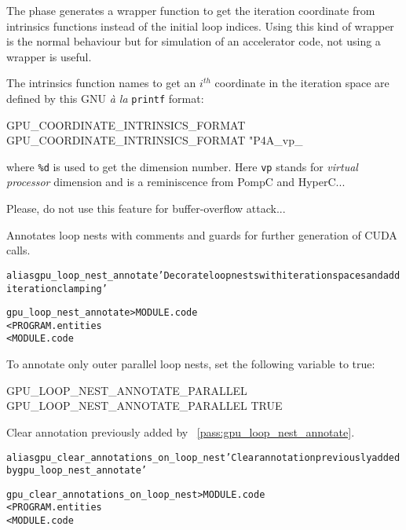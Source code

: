 \documentclass[a4paper]{report}
\newenvironment{PipsMake}{\begin{alltt}}{\end{alltt}}
\newcommand{\PipsPassRef}[1]{\texttt{\detokenize{#1}}~\ref{pass:#1}}
\newenvironment{PipsPass}[1]{\label{pass:#1}}{}
\begin{document}
The phase generates a wrapper function to get the iteration coordinate from
intrinsics functions instead of the initial loop indices. Using this kind
of wrapper is the normal behaviour but for simulation of an accelerator
code, not using a wrapper is useful.

The intrinsics function names to get an $i^{th}$ coordinate in the
iteration space are defined by this GNU \emph{\`a la} \texttt{printf}
format:
\begin{PipsProp}{GPU_COORDINATE_INTRINSICS_FORMAT}
GPU_COORDINATE_INTRINSICS_FORMAT "P4A_vp_%
\end{PipsProp}
where \verb|%d| is used to get the dimension number. Here \texttt{vp}
stands for \emph{virtual processor} dimension and is a reminiscence from
PompC and HyperC...

Please, do not use this feature for buffer-overflow attack...



\begin{PipsPass}{gpu_loop_nest_annotate}
Annotates loop nests with comments and guards for further generation of CUDA calls.
\end{PipsPass}

\begin{PipsMake}
alias gpu_loop_nest_annotate 'Decorate loop nests with iteration spaces and add iteration clamping'

gpu_loop_nest_annotate	        > MODULE.code
        < PROGRAM.entities
        < MODULE.code

\end{PipsMake}

To annotate only outer parallel loop nests, set the following variable to true:
\begin{PipsProp}{GPU_LOOP_NEST_ANNOTATE_PARALLEL}
GPU_LOOP_NEST_ANNOTATE_PARALLEL TRUE
\end{PipsProp}



\begin{PipsPass}{gpu_clear_annotations_on_loop_nest}
Clear annotation previously added by \PipsPassRef{gpu_loop_nest_annotate}.
\end{PipsPass}

\begin{PipsMake}
alias gpu_clear_annotations_on_loop_nest 'Clear annotation previously added by gpu_loop_nest_annotate'

gpu_clear_annotations_on_loop_nest   > MODULE.code
        < PROGRAM.entities
        < MODULE.code
\end{PipsMake}
\end{document}
